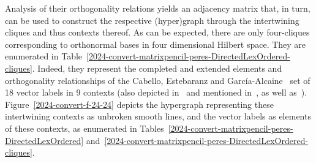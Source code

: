 \documentclass[
  twocolumn,
 showpacs,
 showkeys,
 preprintnumbers,
 amsmath,amssymb,
 aps,
 prl,
  longbibliography,
 floatfix,
 ]{revtex4-2}
\begin{document}
Analysis of their orthogonality relations yields an adjacency matrix that, in turn, can be used to construct the respective (hyper)graph through the intertwining cliques and thus contexts thereof.
As can be expected, there are only four-cliques corresponding to orthonormal bases in four dimensional Hilbert space. They are enumerated in Table~\ref{2024-convert-matrixpencil-peres-DirectedLexOrdered-cliques}.
Indeed, they represent the completed and extended elements and orthogonality relationships of the Cabello, Estebaranz and Garc{\'{i}}a-Alcaine~\cite{cabello-96} set of 18 vector labels in 9 contexts (also depicted in~\cite[Figure 4(c)]{pavicic-2004ksafq}
and mentioned in~\cite{pavicic-2010nkss}, as well as~\cite[Figure 2]{2010-qchocolate}).
Figure~\ref{2024-convert-f-24-24} depicts the hypergraph representing these intertwining contexts as unbroken smooth lines, and the vector labels as elements of these contexts, as enumerated in Tables~\ref{2024-convert-matrixpencil-peres-DirectedLexOrdered} and~\ref{2024-convert-matrixpencil-peres-DirectedLexOrdered-cliques}.
\end{document}
